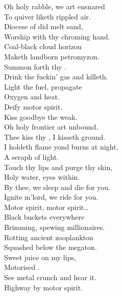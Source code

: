 
\label{album:petrodragonic-apocalypse}




Oh holy rabble, we art ensnared \\
To quiver liketh rippled air. \\
Diocese of did melt sand, \\
Worship with thy chroming hand. \\
Coal-black cloud horizon \\
Maketh landborn petromyzon. \\
Summon forth thy . \\
Drink the fuckin' gas and killeth. \\

Light the fuel, propagate \\
Oxygen and heat. \\
Deify motor spirit. \\
Kiss goodbye the weak. \\

Oh holy frontier art unbound. \\
Thee kiss thy , I kisseth ground. \\
I holdeth flame yond burns at night, \\
A seraph of  light. \\
Touch thy lips and purge thy skin, \\
Holy water, eyes within. \\
By thee, we sleep and die for you. \\
Ignite m'lord, we ride for you. \\

Motor spirit, motor spirit… \\

Black buckets everywhere \\
Brimming, spewing millionaires. \\
Rotting ancient zooplankton \\
Squashed below the megaton. \\
Sweet juice on my lips, \\
Motorised . \\
See metal crunch and hear it. \\
Highway  by motor spirit. \\

